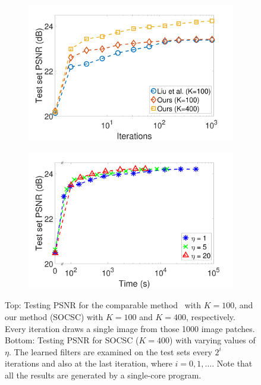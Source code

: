 \begin{figure}[h]
\centering
\begin{subfigure}{0.5\textwidth}
  \includegraphics[width=1\linewidth]{figure/overComplete-ite.pdf}
\end{subfigure}
\begin{subfigure}{0.5\textwidth}
  \includegraphics[width=1\linewidth]{figure/minibatch.pdf}
\end{subfigure}

\caption{Top: Testing PSNR for the comparable method~\cite{liu-2018-first} with $K=100$, and our method (SOCSC) with $K=100$ and $K=400$, respectively. Every iteration draws a single image from those 1000 image patches. Bottom: Testing PSNR for SOCSC ($K=400$) with varying values of $\eta$. The learned filters are examined on the test sets every $2^i$ iterations and also at the last iteration, where $i=0,1,\dots$. Note that all the results are generated by a single-core program.}
\label{fig:overComDicAndMinibatch}
\end{figure}

